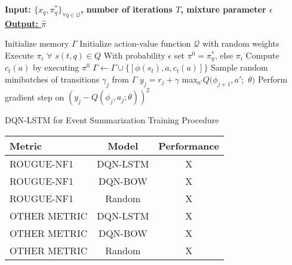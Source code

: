 \documentclass[12pt]{article}
\begin{document}
\begin{algorithm}
    \bf{Input:} { \rm $\{ x_q, \pi^{*}_q \}_{\forall q \in \mathcal{Q} }$, number of iterations $T$, mixture parameter $\epsilon$  } \\
    \underline{\bf{Output:}  $\hat{\pi}$ }
  \begin{algorithmic}[1]
  \STATE \rm Initialize memory $\Gamma$
  \STATE \rm Initialize action-value function $\mathcal{Q}$ with random weights
        \STATE \rm Execute $\pi_i$ $\forall$ $s(t,q) \in Q$
        		\STATE \rm With probability $\epsilon$ set $\pi^0 = \pi^{*}_q$, else $\pi_i$
		\STATE Compute $c_t(a)$ by executing $\pi^0$
		\STATE $\Gamma \leftarrow \Gamma \cup \{ [\phi(s_t), a, c_t(a)]\}$
        \ENDFOR
        \STATE Sample random minibatches of transitions $\gamma_j$ from $\Gamma$
        \STATE $y_j = r_j + \gamma$ max$_{a'}Q(\phi_{j+1}, a';$ $\theta)$
        \STATE Perform gradient step on $(y_j - Q(\phi_j, a_j; \theta))^2$
      \ENDFOR
    \ENDFOR
  \end{algorithmic}
    \caption{DQN-LSTM for Event Summarization Training Procedure}
\end{algorithm}


\begin{tabular}{ l | c | c  }
	\hline
	Metric  & Model  & Performance\\ \hline \hline
  	ROUGUE-NF1 & DQN-LSTM  & X \\
  	ROUGUE-NF1 & DQN-BOW  & X \\
  	ROUGUE-NF1 & Random  & X \\ \hline
  	OTHER METRIC & DQN-LSTM  & X \\
  	OTHER METRIC & DQN-BOW  & X \\
  	OTHER METRIC & Random  & X \\ \hline
	\hline
\end{tabular}



\newpage


\end{document}
